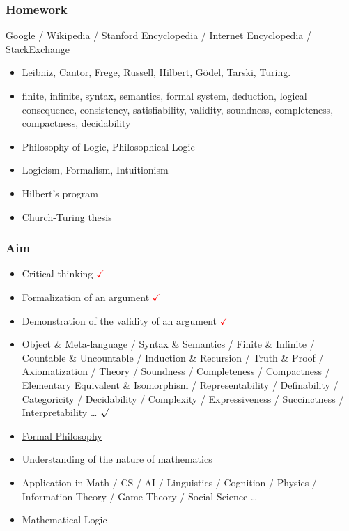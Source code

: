 \documentclass[UTF8,11pt,colorlinks,compress,openany]{beamer}%
\begin{document}
\begin{frame}\frametitle{Homework}
		\href{https://www.google.com/}{Google} / \href{https://www.wikipedia.org/}{Wikipedia} / \href{https://plato.stanford.edu/}{Stanford Encyclopedia} / \href{https://www.iep.utm.edu/}{Internet Encyclopedia} / \href{https://stackexchange.com/}{StackExchange}
		\begin{itemize}
			\item Leibniz, Cantor, Frege, Russell, Hilbert, G\"odel, Tarski, Turing.
			\item finite, infinite, syntax, semantics, formal system, deduction, logical consequence, consistency, satisfiability, validity, soundness, completeness, compactness, decidability
			\item Philosophy of Logic, Philosophical Logic
			\item Logicism, Formalism, Intuitionism
			\item Hilbert's program
			\item Church-Turing thesis
		\end{itemize}
\end{frame}

\begin{frame}\frametitle{Aim}
	\begin{itemize}
		\item Critical thinking \textcolor{red}{$\checkmark$}
		\item Formalization of an argument \textcolor{red}{$\checkmark$}
		\item Demonstration of the validity of an argument \textcolor{red}{$\checkmark$}
		\item {\small Object \& Meta-language / Syntax \& Semantics / Finite \& Infinite / Countable \& Uncountable / Induction \& Recursion / Truth \& Proof / Axiomatization / Theory / Soundness / Completeness / Compactness / Elementary Equivalent \& Isomorphism / Representability / Definability / Categoricity / Decidability / Complexity / Expressiveness / Succinctness / Interpretability \dots} \textcolor{green}{$\surd$}
		\item \href{https://plato.stanford.edu/entries/formal-epistemology/}{Formal Philosophy}
		\item Understanding of the nature of mathematics
		\item Application in Math / CS / AI / Linguistics / Cognition / Physics / Information Theory / Game Theory / Social Science \dots
		\item Mathematical Logic
	\end{itemize}
\end{frame}
\end{document}
